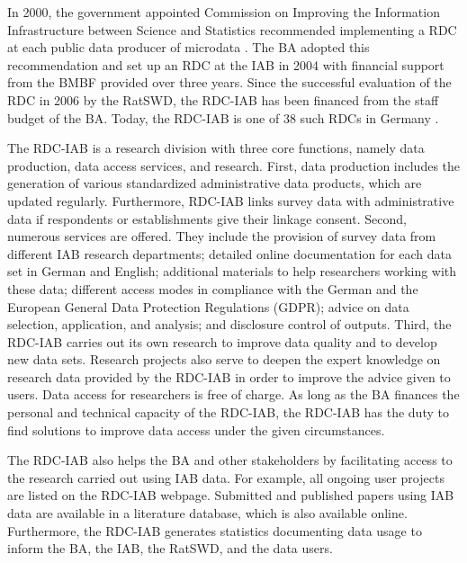 In 2000, the government appointed Commission on Improving the Information Infrastructure between Science and Statistics recommended implementing a RDC at each public data producer of microdata \citep{kvikommissionzurverbesserungderinformationelleninfrastrukturzwischenwissenschaftundstatistik2001}. The BA adopted this recommendation and set up an RDC at the IAB in 2004 with financial support from the BMBF provided over three years. Since the successful evaluation of the RDC in 2006 by the RatSWD, the RDC-IAB has been financed from the staff budget of the BA. Today, the RDC-IAB is one of 38 such RDCs in Germany \citep{germandataforum}.

The RDC-IAB is a research division with three core functions, namely data production, data access services, and research. First, data production includes the generation of various standardized administrative data products, which are updated regularly. Furthermore, RDC-IAB links survey data with administrative data if respondents or establishments give their linkage consent. Second, numerous services are offered. They include the provision of survey data from different IAB research departments; detailed online documentation for each data set in German and English; additional materials to help researchers working with these data; different access modes in compliance with the German and the European General Data Protection Regulations (GDPR); advice on data selection, application, and analysis; and disclosure control of outputs. Third, the RDC-IAB carries out its own research to improve data quality and to develop new data sets. Research projects also serve to deepen the expert knowledge on research data provided by the RDC-IAB in order to improve the advice given to users. Data access for researchers is free of charge. As long as the BA finances the personal and technical capacity of the RDC-IAB, the RDC-IAB has the duty to find solutions to improve data access under the given circumstances.

The RDC-IAB also helps the BA and other stakeholders by facilitating access to the research carried out using IAB data. For example, all ongoing user projects are listed on the RDC-IAB webpage. Submitted and published papers using IAB data are available in a literature database, which is also available online. Furthermore, the RDC-IAB generates statistics documenting data usage to inform the BA, the IAB, the RatSWD, and the data users.

